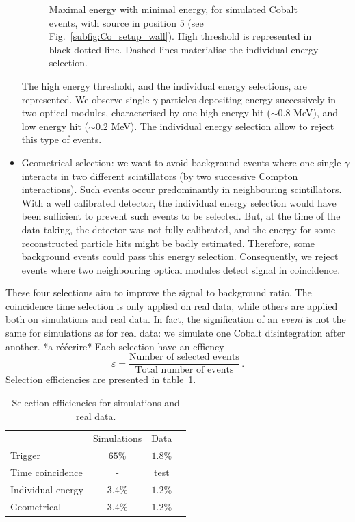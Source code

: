 \begin{itemize}
\begin{figure}[h]
    \caption{Maximal energy with minimal energy, for simulated Cobalt events, with source in position $5$ (see Fig.~\ref{subfig:Co_setup_wall}).
      High threshold is represented in black dotted line.
      Dashed lines materialise the individual energy selection.
      \label{fig:Co_energy_cut}}
  \end{figure}
  The high energy threshold, and the individual energy selections, are represented.
  We observe single $\gamma$ particles depositing energy successively in two optical modules, characterised by one high energy hit ($\sim 0.8$ MeV), and low energy hit ($\sim 0.2$ MeV).
  The individual energy selection allow to reject this type of events.
\item Geometrical selection:
  we want to avoid background events where one single $\gamma$ interacts in two different scintillators (by two successive Compton interactions).
  Such events occur predominantly in neighbouring scintillators.
  With a well calibrated detector, the individual energy selection would have been sufficient to prevent such events to be selected.
  But, at the time of the data-taking, the detector was not fully calibrated, and the energy for some reconstructed particle hits might be badly estimated.
  Therefore, some background events could pass this energy selection.
  Consequently, we reject events where two neighbouring optical modules detect signal in coincidence.
\end{itemize}

These four selections aim to improve the signal to background ratio.
The coincidence time selection is only applied on real data, while others are applied both on simulations and real data.
In fact, the signification of an \emph{event} is not the same for simulations as for real data: we simulate one Cobalt disintegration after another.
*a réécrire*
Each selection have an effiency
\begin{equation}
  \varepsilon = \frac{\text{Number of selected events}}{\text{Total number of events}}\,.
\end{equation}
Selection efficiencies are presented in table~\ref{tab:Co_cut_eff}.
\begin{table}[h]
  \centering

  \begin{tabular}{ l c c c }
    & Simulations & Data \\
    Trigger & $65$\% & $1.8$\% \\
    Time coincidence & - & test \\
    Individual energy & $3.4$\% & $1.2$\% \\
    Geometrical & $3.4$\% & $1.2$\% \\
  \end{tabular}

  \caption{Selection efficiencies for simulations and real data.
    \label{tab:Co_cut_eff}}
\end{table}


